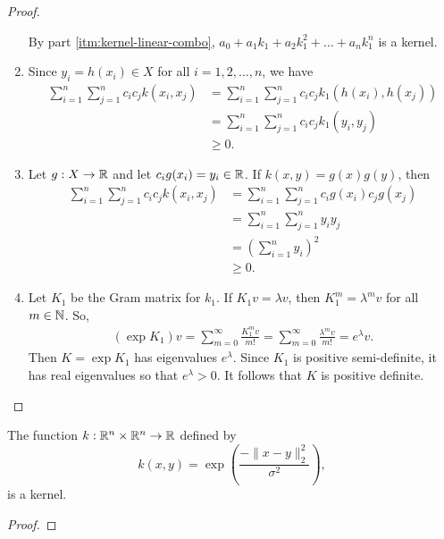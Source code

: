 \begin{proof}
\begin{enumerate}
        By part \ref{itm:kernel-linear-combo}, \(a_0 + a_1 k_1 + a_2 k_1^2 + \dots + a_n k_1^n\) is a kernel.
        \item Since \(y_i = h(x_i) \in X\) for all \(i = 1,2,\dots, n\), we have
        \begin{align*}
            \sum_{i=1}^{n} \sum_{j=1}^{n} c_i c_j k(x_i,x_j)
            &= \sum_{i=1}^{n} \sum_{j=1}^{n} c_i c_j k_1(h(x_i), h(x_j))\\
            &= \sum_{i=1}^{n} \sum_{j=1}^{n} c_i c_j k_1(y_i, y_j)\\
            &\geq 0.
        \end{align*}
        \item Let \(g : X \to \mathbb{R}\) and let \(c_i g(x_i) = y_i \in \mathbb{R}\).
        If \(k(x,y) = g(x)g(y)\), then
        \begin{align*}
            \sum_{i=1}^{n} \sum_{j=1}^{n} c_i c_j k(x_i,x_j)
            &= \sum_{i=1}^{n} \sum_{j=1}^{n} c_i g(x_i) c_j g(x_j)\\
            &= \sum_{i=1}^{n} \sum_{j=1}^{n} y_i y_j\\
            &= \left(\sum_{i=1}^{n} y_i\right)^2\\
            &\geq 0.
        \end{align*}
        \item Let \(K_1\) be the Gram matrix for \(k_1\).
        If \(K_1 v = \lambda v\), then \(K_1^m = \lambda^m v\) for all \(m \in \mathbb{N}\).
        So,
        \begin{align*}
            (\exp K_1) v
            = \sum_{m=0}^{\infty} \frac{K_1^m v}{m!}
            = \sum_{m=0}^{\infty} \frac{\lambda^m v}{m!}
            = e^\lambda v.
        \end{align*}
        Then \(K = \exp K_1\) has eigenvalues \(e^\lambda\).
        Since \(K_1\) is positive semi-definite, it has real eigenvalues so that \(e^\lambda > 0\).
        It follows that \(K\) is positive definite.
    \end{enumerate}
\end{proof}

\begin{theorem}
    \label{thm:gaussian-kernel}
    The function \(k : \mathbb{R}^n \times \mathbb{R}^n \to \mathbb{R}\) defined by
    \[k(x,y) = \exp\left(\dfrac{-\|x-y\|^2_2}{\sigma^2}\right),\]
    is a kernel.
\end{theorem}

\begin{proof}
    
\end{proof}